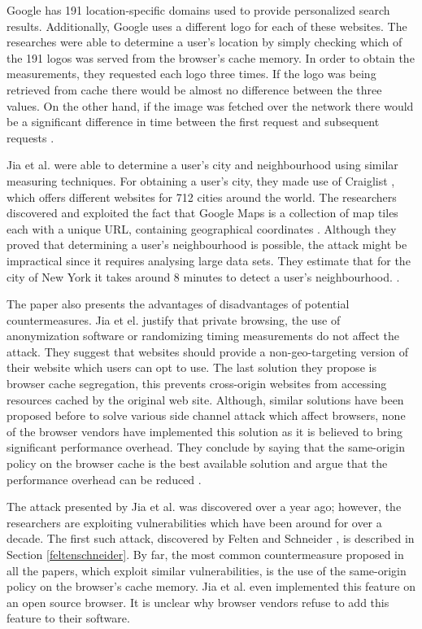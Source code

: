 \documentclass[10pt,a4paper,twoside]{book}
\begin{document}
Google has 191 location-specific domains used to provide personalized search results. Additionally, Google uses a different logo for each of these websites. The researches were able to determine a user's location by simply checking which of the 191 logos was served from the browser's cache memory. In order to obtain the measurements, they requested each logo three times. If the logo was being retrieved from cache there would be almost no difference between the three values. On the other hand, if the image was fetched over the network there would be a significant difference in time between the first request and subsequent requests \cite{jia2015know}.

Jia et al. \cite{jia2015know} were able to determine a user's city and neighbourhood using similar measuring techniques. For obtaining a user's city, they made use of Craiglist \cite{craiglist}, which offers different websites for 712 cities around the world. The researchers discovered and exploited the fact that Google Maps is a collection of map tiles each with a unique URL, containing geographical coordinates \cite{jia2015know}. Although they proved that determining a user's neighbourhood is possible, the attack might be impractical since it requires analysing large data sets. They estimate that for the city of New York it takes around 8 minutes to detect a user's neighbourhood. \cite{jia2015know}.

The paper also presents the advantages of disadvantages of potential countermeasures. Jia et el. \cite{jia2015know} justify that private browsing, the use of anonymization software or randomizing timing measurements do not affect the attack. They suggest that websites should provide a non-geo-targeting version of their website which users can opt to use. The last solution they propose is browser cache segregation, this prevents cross-origin websites from accessing resources cached by the original web site. Although, similar solutions have been proposed before to solve various side channel attack which affect browsers, none of the browser vendors have implemented this solution as it is believed to bring significant performance overhead. They conclude by saying that the same-origin policy on the browser cache is the best available solution and argue that the performance overhead can be reduced \cite{jia2015know}.

The attack presented by Jia et al. \cite{jia2015know} was discovered over a year ago; however, the researchers are exploiting vulnerabilities which have been around for over a decade. The first such attack, discovered by Felten and Schneider \cite{felten2000timing}, is described in Section \ref{feltenschneider}. By far, the most common countermeasure proposed in all the papers, which exploit similar vulnerabilities, is the use of the same-origin policy on the browser's cache memory. Jia et al. \cite{jia2015know} even implemented this feature on an open source browser. It is unclear why browser vendors refuse to add this feature to their software. 
\end{document}
